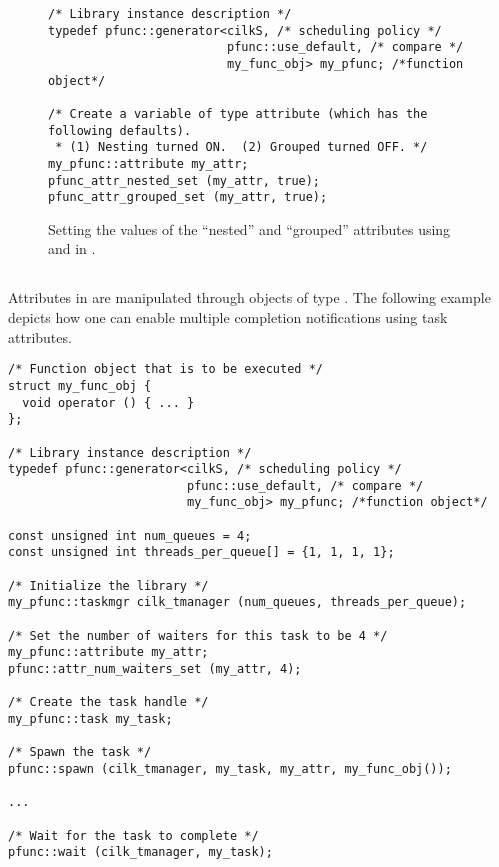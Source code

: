 \begin{figure}[h]
\begin{center}
\begin{minipage}{0.65\textwidth}
\lstset{frame=lrtb}
\begin{lstlisting}
/* Library instance description */
typedef pfunc::generator<cilkS, /* scheduling policy */
                         pfunc::use_default, /* compare */
                         my_func_obj> my_pfunc; /*function object*/

/* Create a variable of type attribute (which has the following defaults).
 * (1) Nesting turned ON.  (2) Grouped turned OFF. */
my_pfunc::attribute my_attr;
pfunc_attr_nested_set (my_attr, true);
pfunc_attr_grouped_set (my_attr, true);
\end{lstlisting}
\end{minipage}
\end{center}
\caption{Setting the values of the ``nested'' and ``grouped'' attributes using
 and  in \Cpp{}.}
\label{fig:nested}
\end{figure}

\subsection{\Cpp{}}
Attributes in \Cpp{} are manipulated through objects of type .
The following example depicts how one can enable multiple completion
notifications using task attributes.

\begin{lstlisting}
/* Function object that is to be executed */
struct my_func_obj {
  void operator () { ... }
};

/* Library instance description */
typedef pfunc::generator<cilkS, /* scheduling policy */
                         pfunc::use_default, /* compare */
                         my_func_obj> my_pfunc; /*function object*/

const unsigned int num_queues = 4; 
const unsigned int threads_per_queue[] = {1, 1, 1, 1}; 

/* Initialize the library */
my_pfunc::taskmgr cilk_tmanager (num_queues, threads_per_queue);

/* Set the number of waiters for this task to be 4 */
my_pfunc::attribute my_attr;
pfunc::attr_num_waiters_set (my_attr, 4);

/* Create the task handle */
my_pfunc::task my_task;

/* Spawn the task */
pfunc::spawn (cilk_tmanager, my_task, my_attr, my_func_obj());

...

/* Wait for the task to complete */
pfunc::wait (cilk_tmanager, my_task);
\end{lstlisting}

